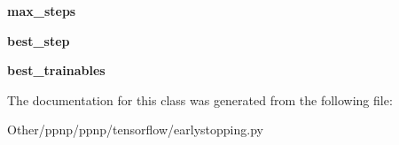 \begin{DoxyCompactItemize}
{\bfseries max\+\_\+steps}
\item 
\mbox{\label{classppnp_1_1tensorflow_1_1earlystopping_1_1EarlyStopping_ae7c55a78b936328b3a46f27ddc749c99}} 
{\bfseries best\+\_\+step}
\item 
\mbox{\label{classppnp_1_1tensorflow_1_1earlystopping_1_1EarlyStopping_ac7e3466ca2a11e51b1cf54ceb3be9a54}} 
{\bfseries best\+\_\+trainables}
\end{DoxyCompactItemize}


The documentation for this class was generated from the following file\+:\begin{DoxyCompactItemize}
\item 
Other/ppnp/ppnp/tensorflow/earlystopping.\+py\end{DoxyCompactItemize}
